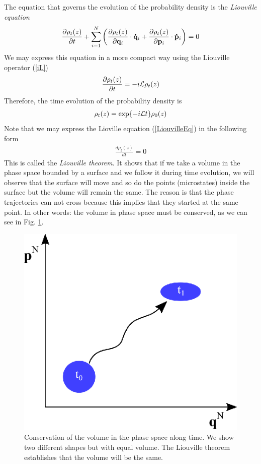 \documentclass[b5paper,openright,11pt]{book}
\begin{document}
The equation that governs the evolution of the probability density is the {\it Liouville equation}
\begin{equation}
    \frac{\partial\rho_t(z)}{\partial t} + \sum_{i=1}^N\left(\frac{\partial\rho_t(z)}{\partial{\bf q}_i}\cdot{\bf \dot{q}}_i+\frac{\partial\rho_t(z)}{\partial{\bf p}_i}\cdot{\bf \dot{p}}_i\right) = 0
\end{equation}
We may express this equation in a more compact way using the Liouville operator (\ref{iL}) 
\begin{align}
    \frac{\partial\rho_t(z)}{\partial t} = -i{\cal L}\rho_t(z)
  \label{LiouvilleEq}
\end{align}
Therefore, the time evolution of the probability density is
\begin{align}
    \rho_t(z) = {\rm exp}\{-i{\cal L}t\}\rho_0(z)
    \label{rhot}
\end{align}
Note that we may express the Lioville equation (\ref{LiouvilleEq}) in the following form
\begin{align}
    \frac{d\rho_t(z)}{dt} = 0 
    \label{LiouvilleTh}
\end{align}
This is called the {\it Liouville theorem}. It shows that if we take a volume in the phase space bounded by a surface and we follow it during time evolution, we will observe that the surface will move and so do the points (microstates) inside the surface but the volume will remain the same. The reason is that the phase trajectories can not cross because this implies that they started at the same point. In other words: the volume in phase space must be conserved, as we can see in Fig. \ref{fig:LiouvilleTh}.

\begin{figure}
    \centering
    \includegraphics[scale=0.9]{Liouville}
    \caption[The Liouville theorem]{Conservation of the volume in the phase space along time. We show two different shapes but with equal volume. The Liouville theorem establishes that the volume will be the same.}
    \label{fig:LiouvilleTh}
\end{figure}
\end{document}
